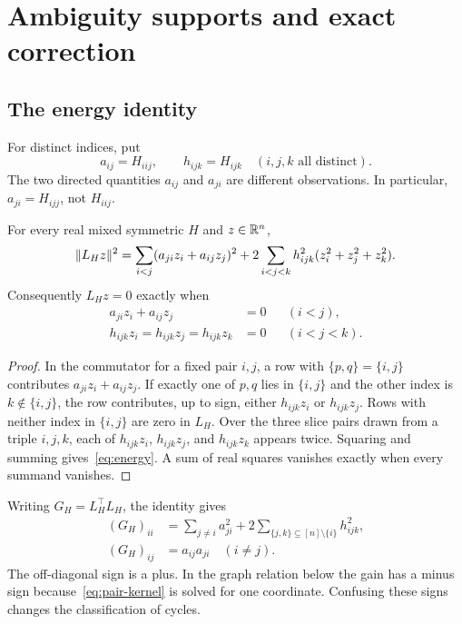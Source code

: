 \section{Ambiguity supports and exact correction}\label{sec:graph}
\subsection{The energy identity}
For distinct indices, put
\[
 a_{ij}=H_{iij},\qquad h_{ijk}=H_{ijk}\quad(i,j,k\text{ all distinct}).
\]
The two directed quantities $a_{ij}$ and $a_{ji}$ are different observations. In particular, $a_{ji}=H_{ijj}$, not $H_{iij}$.

\begin{lemma}\label{lem:energy}
For every real mixed symmetric $H$ and $z\in\mathbb R^n$,
\begin{equation}\label{eq:energy}
 \lVert L_Hz\rVert^2
 =\sum_{i<j}(a_{ji}z_i+a_{ij}z_j)^2
 +2\sum_{i<j<k}h_{ijk}^2(z_i^2+z_j^2+z_k^2).
\end{equation}
Consequently $L_Hz=0$ exactly when
\begin{align}
 a_{ji}z_i+a_{ij}z_j&=0 &&(i<j),\label{eq:pair-kernel}\\
 h_{ijk}z_i=h_{ijk}z_j=h_{ijk}z_k&=0 &&(i<j<k).\label{eq:triple-kernel}
\end{align}
\end{lemma}
\begin{proof}
In the commutator for a fixed pair $i,j$, a row with $\{p,q\}=\{i,j\}$ contributes $a_{ji}z_i+a_{ij}z_j$. If exactly one of $p,q$ lies in $\{i,j\}$ and the other index is $k\notin\{i,j\}$, the row contributes, up to sign, either $h_{ijk}z_i$ or $h_{ijk}z_j$. Rows with neither index in $\{i,j\}$ are zero in $L_H$. Over the three slice pairs drawn from a triple $i,j,k$, each of $h_{ijk}z_i$, $h_{ijk}z_j$, and $h_{ijk}z_k$ appears twice. Squaring and summing gives~\eqref{eq:energy}. A sum of real squares vanishes exactly when every summand vanishes.
\end{proof}

Writing $G_H=L_H^\top L_H$, the identity gives
\begin{align}
 (G_H)_{ii}&=\sum_{j\ne i}a_{ji}^2
       +2\sum_{\{j,k\}\subseteq[n]\setminus\{i\}}h_{ijk}^2,\label{eq:gram}\\
 (G_H)_{ij}&=a_{ij}a_{ji}\quad(i\ne j).\nonumber
\end{align}
The off-diagonal sign is a plus. In the graph relation below the gain has a minus sign because~\eqref{eq:pair-kernel} is solved for one coordinate. Confusing these signs changes the classification of cycles.

